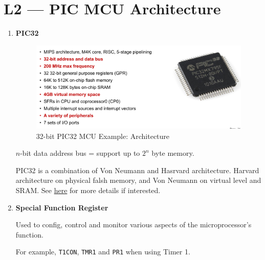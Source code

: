 \documentclass[a4paper]{article}
\begin{document}
\section*{L2 --- PIC MCU Architecture}
  \begin{enumerate}[label = \arabic*.]
    \item \textbf{PIC32}
      \begin{figure}[H]
        \centering
        \includegraphics[width=0.9\linewidth]{PIC32_MCU_Architecture_specification.jpeg}
        \caption{32-bit PIC32 MCU Example: Architecture}
        \label{fig:PIC32_MCU_Architecture_specification.jpeg}
      \end{figure}

      \par \( n \)-bit data address bus = support up to \( 2^n \) byte memory.

      \par PIC32 is a combination of Von Neumann and Hasrvard architecture. Harvard architecture on physical falsh memory, and Von Neumann on virtual level and SRAM. See \href{https://blog.flyingpic24.com/2008/10/26/pic32-harvard-or-von-neumann/}{here} for more details if interested.
    \item \textbf{Special Function Register}
      \par Used to config, control and monitor various aspects of the microprocessor's function.
      \par For example, \verb|T1CON|, \verb|TMR1| and \verb|PR1| when using Timer 1.
  \end{enumerate}
\end{document}
